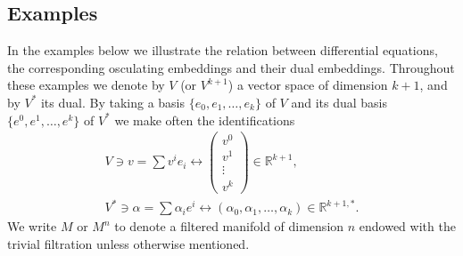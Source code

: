 \documentclass[pdftex]{sigma}%
\newcommand{\R}{\mathbb R}
\numberwithin{equation}{section}
\begin{document}
\subsection{Examples}
In the examples below we illustrate the relation between differential equations, the corresponding osculating embeddings and their dual embeddings. Throughout these examples we denote by $V$ (or $V^{k+1}$) a vector space of dimension $k+1$, and by $V^*$ its dual. By taking a basis $\{e_0,e_1,\dots,e_k\}$ of $V$ and its dual basis $\{e^0,e^1,\dots,e^k\}$ of $V^*$ we make often the identifications
\begin{gather*}
V\ni v =\sum v^i e_i \leftrightarrow \begin{pmatrix} v^0 \\ v^1 \\ \vdots \\v^k \end{pmatrix} \in \R^{k+1},
\\
V^*\ni\alpha = \sum\alpha_i e^i \leftrightarrow (\alpha_0,\alpha_1,\dots,\alpha_k)\in \R^{k+1,*}.
\end{gather*}
We write $M$ or $M^n$ to denote a filtered manifold of dimension $n$ endowed with the trivial filtration unless otherwise mentioned.
\end{document}
